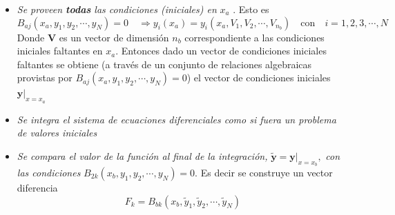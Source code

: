 \documentclass[spanish,titlepage,11pt]{article}
\begin{document}
\begin{itemize}
\item \textit{Se proveen \textbf{todas} las condiciones (iniciales) en }%
$x_{a}$ . \newline Esto es
\[
B_{aj}\left(  x_{a},y_{1},y_{2},\cdots,y_{N}\right)  =0\quad\Rightarrow
y_{i}(x_{a})=y_{i}\left(  x_{a},V_{1},V_{2},\cdots,V_{n_{b}}\right)
\quad\mathrm{con\quad}i=1,2,3,\cdots,N
\]
Donde $\mathbf{V}$ es un vector de dimensi\'{o}n $n_{b}$ correspondiente a las
condiciones iniciales faltantes en $x_{a}$. Entonces dado un vector de
condiciones iniciales faltantes se obtiene (a trav\'{e}s de un conjunto de
relaciones algebraicas provistas por $B_{aj}\left(  x_{a},y_{1},y_{2}%
,\cdots,y_{N}\right)  =0$) el vector de condiciones iniciales $\left.
\mathbf{y}\right|  _{x=x_{a}}$

\item \textit{Se integra el sistema de ecuaciones diferenciales como si fuera
un pro\-ble\-ma de valores iniciales}

\item \textit{Se compara el valor de la funci\'{o}n al final de la
integraci\'{o}n, }$\mathbf{\tilde{y}=}\left.  \mathbf{y}\right|  _{x=x_{b}},$
\textit{con las condiciones} $B_{2k}\left(  x_{b},y_{1},y_{2},\cdots
,y_{N}\right)  =0. $ Es decir se construye un vector diferencia
\[
F_{k}=B_{bk}\left(  x_{b},\tilde{y}_{1},\tilde{y}_{2},\cdots,\tilde{y}%
_{N}\right)
\]


\end{itemize}
\end{document}
